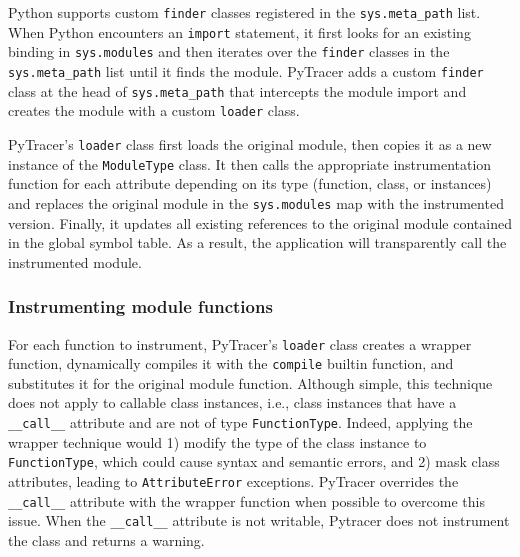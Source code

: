 \documentclass[10pt,journal,compsoc]{IEEEtran}
\newcommand{\pytracer}[0]{PyTracer\xspace}
\DeclareRobustCommand{\remove}[1]{}
\begin{document}
Python supports custom \texttt{finder} classes registered in the
\texttt{sys.meta\_path} list. When Python encounters an \texttt{import}
statement, it first looks for an existing binding in \texttt{sys.modules} and
then iterates over the \texttt{finder} classes in the \texttt{sys.meta\_path}
list until it finds the module. \pytracer adds a custom \texttt{finder} class at
the head of \texttt{sys.meta\_path} that intercepts the module import and
creates the module with a custom \texttt{loader} class.

\pytracer's \texttt{loader} class first loads the original module, then copies
it as a new instance of the \texttt{ModuleType} class. It then calls the
appropriate instrumentation function for each attribute depending on its type
(function, class, or instances) and replaces the original module in the
\texttt{sys.modules} map with the instrumented version. Finally, it updates all
existing references to the original module contained in the global symbol table.
As a result, the application will transparently call the instrumented module.

\subsubsection{Instrumenting module functions}

\remove{Listings~\mbox{\ref{fig:wrapper_creation}} and~\mbox{\ref{fig:generic_wrapper}} show
    \mbox{\pytracer}'s function instrumentation mechanism.}
For each function to instrument, \pytracer's \texttt{loader} class creates a
wrapper function, dynamically compiles it with the \texttt{compile} builtin
function, and substitutes it for the original module function.  Although simple,
this technique does not apply to callable class instances, i.e., class instances
that have a \texttt{\_\_call\_\_} attribute and are not of type
\texttt{FunctionType}. Indeed, applying the wrapper technique would 1) modify
the type of the class instance to \texttt{FunctionType}, which could cause
syntax and semantic errors, and 2) mask class attributes, leading to
\texttt{AttributeError} exceptions. \pytracer overrides the
\texttt{\_\_call\_\_} attribute with the wrapper function when possible to
overcome this issue. When the \texttt{\_\_call\_\_} attribute is not writable,
Pytracer does not instrument the class and returns a warning. 

\end{document}
